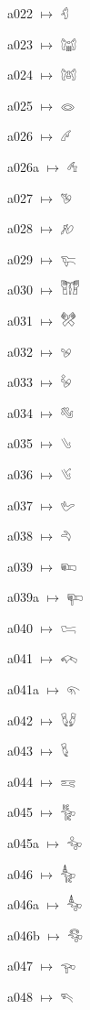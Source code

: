 {\noindent a022 $\mapsto$ {\ahfont 𔐖}\par
\noindent a023 $\mapsto$ {\ahfont 𔐗}\par
\noindent a024 $\mapsto$ {\ahfont 𔐘}\par
\noindent a025 $\mapsto$ {\ahfont 𔐙}\par
\noindent a026 $\mapsto$ {\ahfont 𔐚}\par
\noindent a026a $\mapsto$ {\ahfont 𔐛}\par
\noindent a027 $\mapsto$ {\ahfont 𔐜}\par
\noindent a028 $\mapsto$ {\ahfont 𔐝}\par
\noindent a029 $\mapsto$ {\ahfont 𔐞}\par
\noindent a030 $\mapsto$ {\ahfont 𔐟}\par
\noindent a031 $\mapsto$ {\ahfont 𔐠}\par
\noindent a032 $\mapsto$ {\ahfont 𔐡}\par
\noindent a033 $\mapsto$ {\ahfont 𔐢}\par
\noindent a034 $\mapsto$ {\ahfont 𔐣}\par
\noindent a035 $\mapsto$ {\ahfont 𔐤}\par
\noindent a036 $\mapsto$ {\ahfont 𔐥}\par
\noindent a037 $\mapsto$ {\ahfont 𔐦}\par
\noindent a038 $\mapsto$ {\ahfont 𔐧}\par
\noindent a039 $\mapsto$ {\ahfont 𔐨}\par
\noindent a039a $\mapsto$ {\ahfont 𔐩}\par
\noindent a040 $\mapsto$ {\ahfont 𔐪}\par
\noindent a041 $\mapsto$ {\ahfont 𔐫}\par
\noindent a041a $\mapsto$ {\ahfont 𔐬}\par
\noindent a042 $\mapsto$ {\ahfont 𔐭}\par
\noindent a043 $\mapsto$ {\ahfont 𔐮}\par
\noindent a044 $\mapsto$ {\ahfont 𔐯}\par
\noindent a045 $\mapsto$ {\ahfont 𔐰}\par
\noindent a045a $\mapsto$ {\ahfont 𔐱}\par
\noindent a046 $\mapsto$ {\ahfont 𔐲}\par
\noindent a046a $\mapsto$ {\ahfont 𔐳}\par
\noindent a046b $\mapsto$ {\ahfont 𔐴}\par
\noindent a047 $\mapsto$ {\ahfont 𔐵}\par
\noindent a048 $\mapsto$ {\ahfont 𔐶}\par
}
